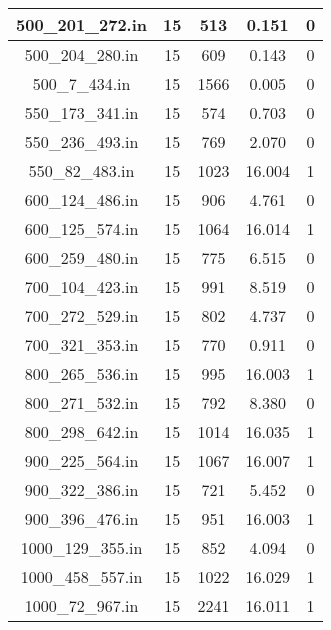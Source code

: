 \documentclass[7pt]{article}
\begin{document}
\begin{table}[H]
\begin{tabular}{|c|c|c|c|c|}
    \hline
    500\_201\_272.in & 15 & 513 & 0.151 & 0\\
    \hline
    500\_204\_280.in & 15 & 609 & 0.143 & 0\\
    \hline
    500\_7\_434.in & 15 & 1566 & 0.005 & 0\\
    \hline
    550\_173\_341.in & 15 & 574 & 0.703 & 0\\
    \hline
    550\_236\_493.in & 15 & 769 & 2.070 & 0\\
    \hline
    550\_82\_483.in & 15 & 1023 & 16.004 & 1\\
    \hline
    600\_124\_486.in & 15 & 906 & 4.761 & 0\\
    \hline
    600\_125\_574.in & 15 & 1064 & 16.014 & 1\\
    \hline
    600\_259\_480.in & 15 & 775 & 6.515 & 0\\
    \hline
    700\_104\_423.in & 15 & 991 & 8.519 & 0\\
    \hline
    700\_272\_529.in & 15 & 802 & 4.737 & 0\\
    \hline
    700\_321\_353.in & 15 & 770 & 0.911 & 0\\
    \hline
    800\_265\_536.in & 15 & 995 & 16.003 & 1\\
    \hline
    800\_271\_532.in & 15 & 792 & 8.380 & 0\\
    \hline
    800\_298\_642.in & 15 & 1014 & 16.035 & 1\\
    \hline
    900\_225\_564.in & 15 & 1067 & 16.007 & 1\\
    \hline
    900\_322\_386.in & 15 & 721 & 5.452 & 0\\
    \hline
    900\_396\_476.in & 15 & 951 & 16.003 & 1\\
    \hline
    1000\_129\_355.in & 15 & 852 & 4.094 & 0\\
    \hline
    1000\_458\_557.in & 15 & 1022 & 16.029 & 1\\
    \hline
    1000\_72\_967.in & 15 & 2241 & 16.011 & 1\\
    \hline
\end{tabular}
\end{table}
\end{document}
